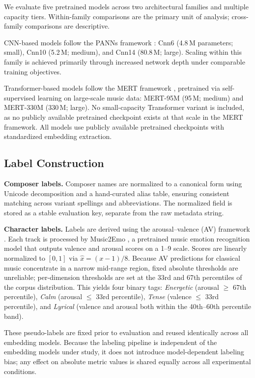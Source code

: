 \documentclass[sigconf]{acmart}
\begin{document}
We evaluate five pretrained models across two architectural families and multiple capacity tiers. Within-family comparisons are the primary unit of analysis; cross-family comparisons are descriptive.

CNN-based models follow the PANNs framework \cite{kong2020panns}: Cnn6 (4.8\,M parameters; small), Cnn10 (5.2\,M; medium), and Cnn14 (80.8\,M; large). Scaling within this family is achieved primarily through increased network depth under comparable training objectives.

Transformer-based models follow the MERT framework \cite{li2023mert}, pretrained via self-supervised learning on large-scale music data: MERT-95M (95\,M; medium) and MERT-330M (330\,M; large). No small-capacity Transformer variant is included, as no publicly available pretrained checkpoint exists at that scale in the MERT framework. All models use publicly available pretrained checkpoints with standardized embedding extraction.

\subsection{Label Construction}

\textbf{Composer labels.} Composer names are normalized to a canonical form using Unicode decomposition and a hand-curated alias table, ensuring consistent matching across variant spellings and abbreviations. The normalized field is stored as a stable evaluation key, separate from the raw metadata string.

\textbf{Character labels.} Labels are derived using the arousal--valence (AV) framework \cite{eerola2011}. Each track is processed by Music2Emo \cite{music2emo2025}, a pretrained music emotion recognition model that outputs valence and arousal scores on a 1--9 scale. Scores are linearly normalized to $[0,1]$ via $\hat{x} = (x-1)/8$. Because AV predictions for classical music concentrate in a narrow mid-range region, fixed absolute thresholds are unreliable; per-dimension thresholds are set at the 33rd and 67th percentiles of the corpus distribution. This yields four binary tags: \textit{Energetic} (arousal $\geq$ 67th percentile), \textit{Calm} (arousal $\leq$ 33rd percentile), \textit{Tense} (valence $\leq$ 33rd percentile), and \textit{Lyrical} (valence and arousal both within the 40th--60th percentile band).

These pseudo-labels are fixed prior to evaluation and reused identically across all embedding models. Because the labeling pipeline is independent of the embedding models under study, it does not introduce model-dependent labeling bias; any effect on absolute metric values is shared equally across all experimental conditions.
\end{document}
